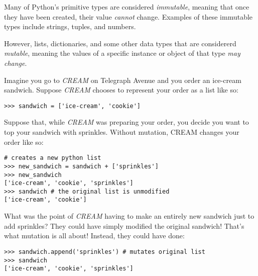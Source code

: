 Many of Python's primitive types are considered {\it immutable}, meaning that once they have been created, their value {\it cannot} change. Examples of these immutable types include strings, tuples, and numbers.

However, lists, dictionaries, and some other data types that are considererd {\it mutable}, meaning the values of a specific instance or object of that type {\it may change}.

Imagine you go to {\it CREAM} on Telegraph Avenue and you order an ice-cream sandwich. Suppose {\it CREAM} chooses to represent your order as a list like so:

\begin{lstlisting}
>>> sandwich = ['ice-cream', 'cookie']
\end{lstlisting}

Suppose that, while {\it CREAM} was preparing your order, you decide you want to top your sandwich with sprinkles. Without mutation, CREAM changes your order like so:

\begin{lstlisting}
# creates a new python list
>>> new_sandwich = sandwich + ['sprinkles']
>>> new_sandwich
['ice-cream', 'cookie', 'sprinkles']
>>> sandwich # the original list is unmodified
['ice-cream', 'cookie']
\end{lstlisting}

What was the point of {\it CREAM} having to make an entirely new sandwich just to add sprinkles? They could have simply modified the original sandwich! That's what mutation is all about! Instead, they could have done:

\begin{lstlisting}
>>> sandwich.append('sprinkles') # mutates original list
>>> sandwich
['ice-cream', 'cookie', 'sprinkles']
\end{lstlisting}